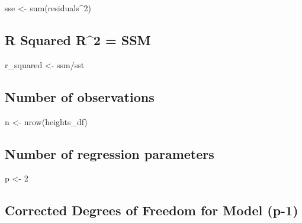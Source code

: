 \documentclass[
]{article}
\newenvironment{Shaded}{\begin{snugshade}}{\end{snugshade}}
\newcommand{\DecValTok}[1]{\textcolor[rgb]{0.00,0.00,0.81}{#1}}
\newcommand{\FunctionTok}[1]{\textcolor[rgb]{0.00,0.00,0.00}{#1}}
\newcommand{\NormalTok}[1]{#1}
\newcommand{\OtherTok}[1]{\textcolor[rgb]{0.56,0.35,0.01}{#1}}
\newcommand{\SpecialCharTok}[1]{\textcolor[rgb]{0.00,0.00,0.00}{#1}}
\begin{document}
\begin{Shaded}
\begin{Highlighting}[]
\NormalTok{sse }\OtherTok{\textless{}{-}} \FunctionTok{sum}\NormalTok{(residuals}\SpecialCharTok{\^{}}\DecValTok{2}\NormalTok{)}
\end{Highlighting}
\end{Shaded}

\hypertarget{r-squared-r2-ssm}{%
\subsection{\texorpdfstring{R Squared R\^{}2 =
SSM\SST}{R Squared R\^{}2 = SSM}}\label{r-squared-r2-ssm}}

\begin{Shaded}
\begin{Highlighting}[]
\NormalTok{r\_squared }\OtherTok{\textless{}{-}}\NormalTok{ ssm}\SpecialCharTok{/}\NormalTok{sst}
\end{Highlighting}
\end{Shaded}

\hypertarget{number-of-observations}{%
\subsection{Number of observations}\label{number-of-observations}}

\begin{Shaded}
\begin{Highlighting}[]
\NormalTok{n }\OtherTok{\textless{}{-}} \FunctionTok{nrow}\NormalTok{(heights\_df)}
\end{Highlighting}
\end{Shaded}

\hypertarget{number-of-regression-parameters}{%
\subsection{Number of regression
parameters}\label{number-of-regression-parameters}}

\begin{Shaded}
\begin{Highlighting}[]
\NormalTok{p }\OtherTok{\textless{}{-}} \DecValTok{2}
\end{Highlighting}
\end{Shaded}

\hypertarget{corrected-degrees-of-freedom-for-model-p-1}{%
\subsection{Corrected Degrees of Freedom for Model
(p-1)}\label{corrected-degrees-of-freedom-for-model-p-1}}
\end{document}
